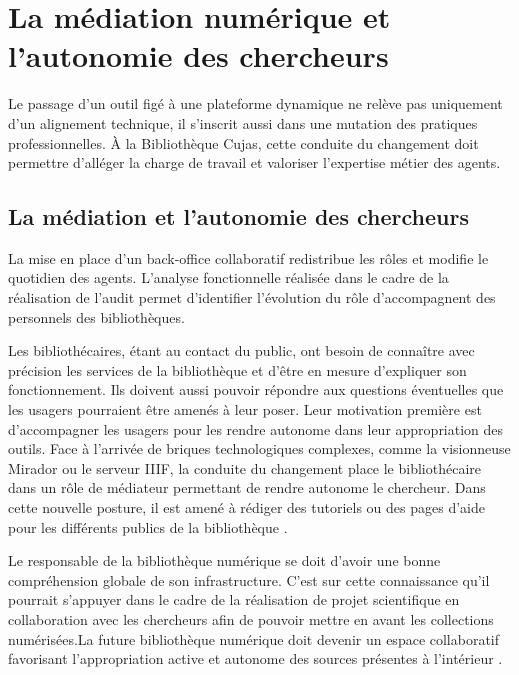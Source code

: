 \section[Médiation et autonomie]{La médiation numérique et l'autonomie des chercheurs}
Le passage d'un outil figé à une plateforme dynamique ne relève pas uniquement d'un alignement technique, il s'inscrit aussi dans une mutation des pratiques professionnelles. À la Bibliothèque Cujas, cette conduite du changement doit permettre d'alléger la charge de travail et valoriser l'expertise métier des agents.

\subsection{La médiation et l'autonomie des chercheurs}
La mise en place d'un back-office collaboratif redistribue les rôles et modifie le quotidien des agents. L'analyse fonctionnelle réalisée dans le cadre de la réalisation de l'audit permet d'identifier l'évolution du rôle d'accompagnent des personnels des bibliothèques. 

Les bibliothécaires, étant au contact du public, ont besoin de connaître avec précision les services de la bibliothèque et d'être en mesure d'expliquer son fonctionnement. Ils doivent aussi pouvoir répondre aux questions éventuelles que les usagers pourraient être amenés à leur poser. Leur motivation première est d'accompagner les usagers pour les rendre autonome dans leur appropriation des outils. Face à l'arrivée de briques technologiques complexes, comme la visionneuse Mirador ou le serveur \ac{IIIF}, la conduite du changement place le bibliothécaire dans un rôle de médiateur permettant de rendre autonome le chercheur. Dans cette nouvelle posture, il est amené à rédiger des tutoriels ou des pages d'aide pour les différents publics de la bibliothèque .

Le responsable de la bibliothèque numérique se doit d'avoir une bonne compréhension globale de son infrastructure. C'est sur cette connaissance qu'il pourrait s'appuyer dans le cadre de la réalisation de projet scientifique en collaboration avec les chercheurs afin de pouvoir mettre en avant les collections numérisées.La future bibliothèque numérique doit devenir un espace collaboratif favorisant l'appropriation active et autonome des sources présentes à l'intérieur .

